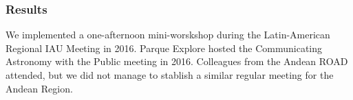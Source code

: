 \subsubsection{Results}
We implemented a one-afternoon mini-worskshop during the Latin-American Regional IAU Meeting in 2016.
Parque Explore hosted the Communicating Astronomy with the Public meeting in 2016. Colleagues from the Andean ROAD attended,
but we did not manage to stablish a similar regular meeting for the Andean Region. 
